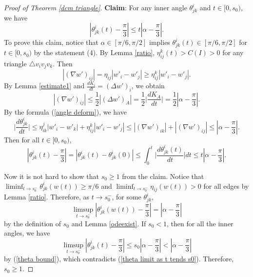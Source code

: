 \documentclass[12pt]{amsart}
\begin{document}
\begin{proof}[Proof of Theorem \ref{dcm triangle}]
   \textbf{Claim}: For any inner angle $\theta^i_{jk}$ and  $t\in [0, s_0)$, we have
      \begin{equation}\label{theta bound}
      |\theta _{jk}^i(t) - \frac{\pi }{3}| \le {t}|\alpha  - \frac{\pi }{3}|.
    \end{equation}
   To prove this claim, notice that $\alpha\in [\pi/6, \pi/2]$ implies $\theta^i_{jk}(t)\in [\pi/6, \pi/2]$ for $t\in [0, s_0)$ by the statement (4). By Lemma \ref{ratio}, $\eta_{ij}^k(t)>C(I)>0$ for any triangle $\triangle v_iv_jv_k$. Then
       $$|{(\nabla w')_{ij}}| = {\eta _{ij}}|{w'_i} - {w'_j}| \ge \eta _{ij}^k|{w'_i} - {w'_j}|.$$
    By Lemma \ref{estimate1} and  ${\frac{{d{K_i}}}{{dt}} = {{(\Delta w')}_i}}$, we obtain
    \begin{equation*}  |{(\nabla w')_{ij}}| \le \frac{1}{2}|{(\Delta w')_A}| = \frac{1}{2}\Big|\frac{{d{K_A}}}{{dt}}\Big| = \frac{1}{2}|\alpha  - \frac{\pi }{3}|.
    \end{equation*}
    By the formula (\ref{angle deform}), we have
    \begin{equation*} \Big|\frac{{d\theta _{jk}^i}}{{dt}}\Big| \le \eta _{ik}^j|{w'_i} - {{w'}_k}| + \eta _{ij}^k|{w'_i} - {w'_j}| \le |{(\nabla w')_{ik}}| + |{(\nabla w')_{ij}}| \le |\alpha  - \frac{\pi }{3}|.
    \end{equation*}
    Then for all $t \in [0,s_0)$,  	
    \begin{equation*}  |\theta _{jk}^i(t) - \frac{\pi }{3}| = |\theta _{jk}^i(t) - \theta _{jk}^i(0)| \le \int_0^t \Big| \frac{{d\theta _{jk}^i(t)}}{{dt}}\Big|dt \le t|\alpha  - \frac{\pi }{3}|.
    \end{equation*}

   Now it is not hard to show that $s_0\geq 1$ from the claim. Notice that $\liminf_{t\to s_0^-} \theta^i_{jk}(w(t)) \geq \pi/6$ and $ \liminf_{t \to s_0^-} \eta_{ij}(w(t))>0$ for all edges by Lemma \ref{ratio}. Therefore, as $t\to s_0^-$, for some $\theta^i_{jk}$,
\begin{equation}\label{theta limit as t tends s0}
  \limsup_{ t \to s_0^-}
    		|\theta^i_{jk}(w(t))-\frac{\pi}{3}|= |\alpha-\frac{\pi}{3}|
\end{equation}
    by the definition of $s_0$ and Lemma \ref{odeexist}.
   If $s_0<1$, then for all the inner angles, we have
   \begin{equation*}  \limsup_{ t \to s_0^-}|\theta _{jk}^i(t) - \frac{\pi }{3}| \le s_0|\alpha  - \frac{\pi }{3}| < |\alpha  - \frac{\pi }{3}|
    \end{equation*}
    by (\ref{theta bound}), which contradicts (\ref{theta limit as t tends s0}). Therefore, $s_0\geq 1$.


\end{proof}
\end{document}
